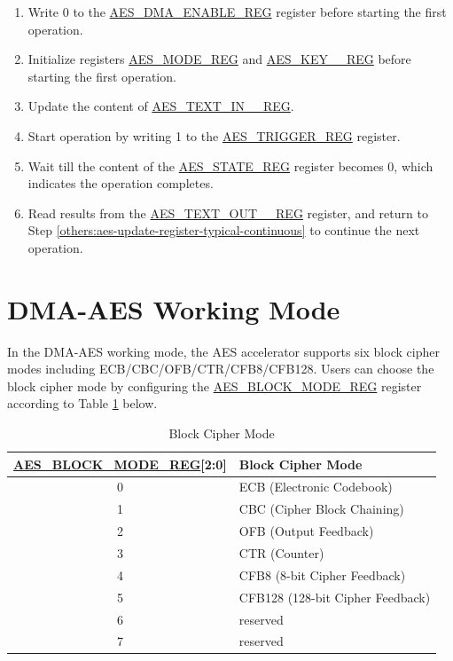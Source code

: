 \documentclass[main\_\_EN.tex]{subfiles}
\begin{document}
\begin{enumerate}
    \item Write 0 to the \hyperref[regdesc:AESDMAENABLEREG]{AES\_DMA\_ENABLE\_REG} register before starting the first operation.
    \item Initialize registers \hyperref[regdesc:AESMODEREG]{AES\_MODE\_REG} and \hyperref[regdesc:AESKEYnREG]{AES\_KEY\_\_REG}
    before starting the first operation.
    \item Update the content of \hyperref[regdesc:AESTEXTINnREG]{AES\_TEXT\_IN\_\_REG}. \label{others:aes-update-register-typical-continuous}
    \item Start operation by writing 1 to the \hyperref[regdesc:AESTRIGGERREG]{AES\_TRIGGER\_REG} register.
    \item Wait till the content of the \hyperref[regdesc:AESSTATEREG]{AES\_STATE\_REG} register becomes 0, which indicates the operation completes.
    \item Read results from the \hyperref[regdesc:AESTEXTOUTnREG]{AES\_TEXT\_OUT\_\_REG} register, \label{read result in typical AES continuous calculation} and return to Step \ref{others:aes-update-register-typical-continuous} to continue the next operation.
\end{enumerate}


\section{DMA-AES Working Mode}\label{sec:aes-dma-aes}

In the DMA-AES working mode, the AES accelerator supports six block cipher modes including ECB/CBC/OFB/CTR/CFB8/CFB128. Users can choose the block cipher mode by configuring the \hyperref[regdesc:AESBLOCKMODEREG]{AES\_BLOCK\_MODE\_REG} register according to Table \ref{tab:aes-block-mode} below.

\begin{longtable}[c]{ | c | l | }
\caption{Block Cipher Mode}
\label{tab:aes-block-mode}
\\\hline
\rowcolor{lightgray}
\hyperref[regdesc:AESBLOCKMODEREG]{AES\_BLOCK\_MODE\_REG}[2:0]     & Block Cipher Mode\\
    \hline
    0                          & ECB (Electronic Codebook)    \\
    \hline
    1                          & CBC (Cipher Block Chaining)     \\
    \hline
    2                          & OFB (Output Feedback)    \\
    \hline
    3                          & CTR (Counter)    \\
    \hline
    4                          & CFB8 (8-bit Cipher Feedback)    \\
    \hline
    5                          & CFB128 (128-bit Cipher Feedback) \\
    \hline
    6                         & reserved \\
    \hline
    7                         & reserved \\
    \hline
\end{longtable}
\end{document}
